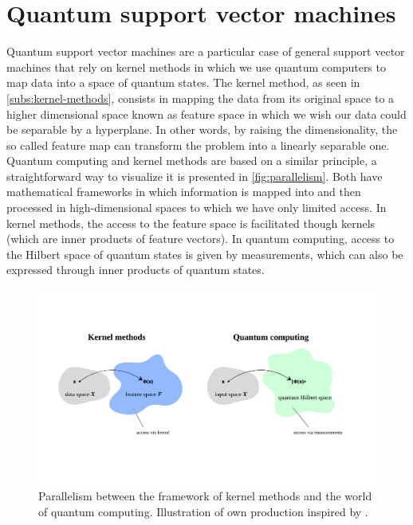 \section{Quantum support vector machines} \label{sec:QSVM}
Quantum support vector machines are a particular case of general support vector machines that rely on kernel methods in which we use quantum computers to map data into a space of quantum states. The kernel method, as seen in \autoref{subs:kernel-methods}, consists in mapping the data from its original space to a higher dimensional space known as feature space in which we wish our data could be separable by a hyperplane. In other words, by raising the dimensionality, the so called feature map can transform the problem into a linearly separable one. Quantum computing and kernel methods are based on a similar principle, a straightforward way to visualize it is presented in \autoref{fig:parallelism}. Both have mathematical frameworks in which information is mapped into and then processed in high-dimensional spaces to which we have only limited access. In kernel methods, the access to the feature space is facilitated though kernels (which are inner products of feature vectors). In quantum computing, access to the Hilbert space of quantum states is given by measurements, which can also be expressed through inner products of quantum states.

\begin{figure}
    \centering
    \includegraphics[width=\linewidth]{img/img-ch3/paralelism_KM-QC.png}
    \caption{Parallelism between the framework of kernel methods and the world of quantum computing. Illustration of own production inspired by \cite{schuld2021machine}.}
    \label{fig:parallelism}
\end{figure}


